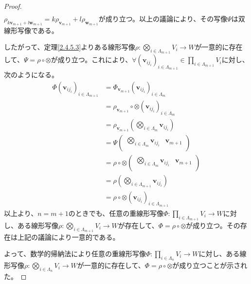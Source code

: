 \documentclass[dvipdfmx]{jsarticle}
\begin{document}
\begin{proof}
\begin{align*}
\end{align*}
$\rho_{k\mathbf{v}_{m + 1} + l\mathbf{w}_{m + 1}} = k\rho_{\mathbf{v}_{m + 1}} + l\rho_{\mathbf{w}_{m + 1}}$が成り立つ。以上の議論により、その写像$\varPsi$は双線形写像である。\par
したがって、定理\ref{2.4.5.3}よりある線形写像$\rho:\bigotimes_{i \in \varLambda_{m + 1}} V_{i} \rightarrow W$が一意的に存在して、$\varPsi = \rho \circ \otimes$が成り立つ。これにより、$\forall\left( \mathbf{v}_{ij_{i}} \right)_{i \in \varLambda_{m + 1}} \in \prod_{i \in \varLambda_{m + 1}} V_{i}$に対し、次のようになる。
\begin{align*}
\varPhi\left( \mathbf{v}_{ij_{i}} \right)_{i \in \varLambda_{m + 1}} &= \varPhi_{\mathbf{v}_{m + 1}}\left( \mathbf{v}_{ij_{i}} \right)_{i \in \varLambda_{m}}\\
&= \rho_{\mathbf{v}_{m + 1}} \circ \otimes \left( \mathbf{v}_{ij_{i}} \right)_{i \in \varLambda_{m}}\\
&= \rho_{\mathbf{v}_{m + 1}}\left( \bigotimes_{i \in \varLambda_{m}} \mathbf{v}_{ij_{i}} \right)\\
&= \varPsi\begin{pmatrix}
\bigotimes_{i \in \varLambda_{m}} \mathbf{v}_{ij_{i}} & \mathbf{v}_{m + 1} \\
\end{pmatrix}\\
&= \rho \circ \otimes \begin{pmatrix}
\bigotimes_{i \in \varLambda_{m}} \mathbf{v}_{ij_{i}} & \mathbf{v}_{m + 1} \\
\end{pmatrix}\\
&= \rho\left( \bigotimes_{i \in \varLambda_{m + 1}} \mathbf{v}_{ij_{i}} \right)\\
&= \rho \circ \otimes \left( \mathbf{v}_{ij_{i}} \right)_{i \in \varLambda_{m + 1}}
\end{align*}
以上より、$n = m + 1$のときでも、任意の重線形写像$\varPhi:\prod_{i \in \varLambda_{m + 1}} V_{i} \rightarrow W$に対し、ある線形写像$\rho:\bigotimes_{i \in \varLambda_{m + 1}} V_{i} \rightarrow W$が存在して、$\varPhi = \rho \circ \otimes$が成り立つ。その存在は上記の議論により一意的である。\par
よって、数学的帰納法により任意の重線形写像$\varPhi:\prod_{i \in \varLambda_{n}} V_{i} \rightarrow W$に対し、ある線形写像$\rho:\bigotimes_{i \in \varLambda_{n}} V_{i} \rightarrow W$が一意的に存在して、$\varPhi = \rho \circ \otimes$が成り立つことが示された。
\end{proof}
\end{document}
